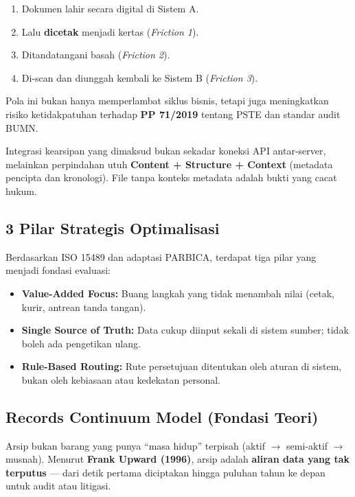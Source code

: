 \documentclass[11pt,a4paper]{article}
\begin{document}
\begin{enumerate}
    \item Dokumen lahir secara digital di Sistem A.
    \item Lalu \textbf{dicetak} menjadi kertas (\textit{Friction 1}).
    \item Ditandatangani basah (\textit{Friction 2}).
    \item Di-scan dan diunggah kembali ke Sistem B (\textit{Friction 3}).
\end{enumerate}

Pola ini bukan hanya memperlambat siklus bisnis, tetapi juga meningkatkan risiko ketidakpatuhan terhadap \textbf{PP 71/2019} tentang PSTE dan standar audit BUMN.

\begin{warnbox}
Integrasi kearsipan yang dimaksud bukan sekadar koneksi API antar-server, melainkan perpindahan utuh \textbf{Content + Structure + Context} (metadata pencipta dan kronologi). File tanpa konteks metadata adalah bukti yang cacat hukum.
\end{warnbox}

\subsection{3 Pilar Strategis Optimalisasi}
Berdasarkan ISO 15489 dan adaptasi PARBICA, terdapat tiga pilar yang menjadi fondasi evaluasi:

\begin{itemize}
    \item \textbf{Value-Added Focus:} Buang langkah yang tidak menambah nilai (cetak, kurir, antrean tanda tangan).
    \item \textbf{Single Source of Truth:} Data cukup diinput sekali di sistem sumber; tidak boleh ada pengetikan ulang.
    \item \textbf{Rule-Based Routing:} Rute persetujuan ditentukan oleh aturan di sistem, bukan oleh kebiasaan atau kedekatan personal.
\end{itemize}

\subsection{Records Continuum Model (Fondasi Teori)}
Arsip bukan barang yang punya ``masa hidup'' terpisah (aktif $\rightarrow$ semi-aktif $\rightarrow$ musnah). Menurut \textbf{Frank Upward (1996)}, arsip adalah \textbf{aliran data yang tak terputus} --- dari detik pertama diciptakan hingga puluhan tahun ke depan untuk audit atau litigasi.
\end{document}
